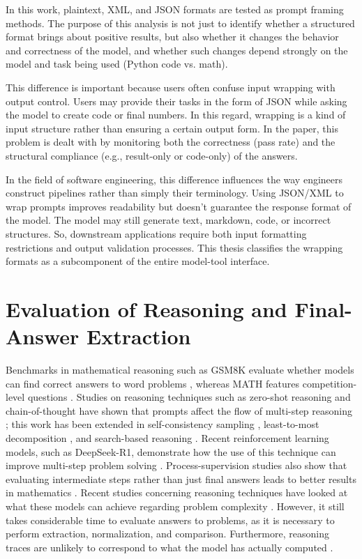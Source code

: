 In this work, plaintext, XML, and JSON formats are tested as prompt framing methods. The purpose of this analysis is not just to identify whether a structured format brings about positive results, but also whether it changes the behavior and correctness of the model, and whether such changes depend strongly on the model and task being used (Python code vs. math).

This difference is important because users often confuse input wrapping with output control. Users may provide their tasks in the form of JSON while asking the model to create code or final numbers. In this regard, wrapping is a kind of input structure rather than ensuring a certain output form. In the paper, this problem is dealt with by monitoring both the correctness (pass rate) and the structural compliance (e.g., result-only or code-only) of the answers.

In the field of software engineering, this difference influences the way engineers construct pipelines rather than simply their terminology. Using JSON/XML to wrap prompts improves readability but doesn’t guarantee the response format of the model. The model may still generate text, markdown, code, or incorrect structures. So, downstream applications require both input formatting restrictions and output validation processes. This thesis classifies the wrapping formats as a subcomponent of the entire model-tool interface.

\section{Evaluation of Reasoning and Final-Answer Extraction}

Benchmarks in mathematical reasoning such as GSM8K evaluate whether models can find correct answers to word problems \cite{cobbe2021gsm8k}, whereas MATH features competition-level questions \cite{hendrycks2021math}. Studies on reasoning techniques such as zero-shot reasoning and chain-of-thought have shown that prompts affect the flow of multi-step reasoning \cite{wei2022cot, kojima2022zeroshot}; this work has been extended in self-consistency sampling \cite{wang2022selfconsistency}, least-to-most decomposition \cite{zhou2022leasttomost}, and search-based reasoning \cite{yao2023tot}. Recent reinforcement learning models, such as DeepSeek-R1, demonstrate how the use of this technique can improve multi-step problem solving \cite{guo2025deepseek}. Process-supervision studies also show that evaluating intermediate steps rather than just final answers leads to better results in mathematics \cite{lightman2023verify, uesato2022process}. Recent studies concerning reasoning techniques have looked at what these models can achieve regarding problem complexity \cite{shojaee2025illusion}. However, it still takes considerable time to evaluate answers to problems, as it is necessary to perform extraction, normalization, and comparison. Furthermore, reasoning traces are unlikely to correspond to what the model has actually computed \cite{turpin2023unfaithful}.

